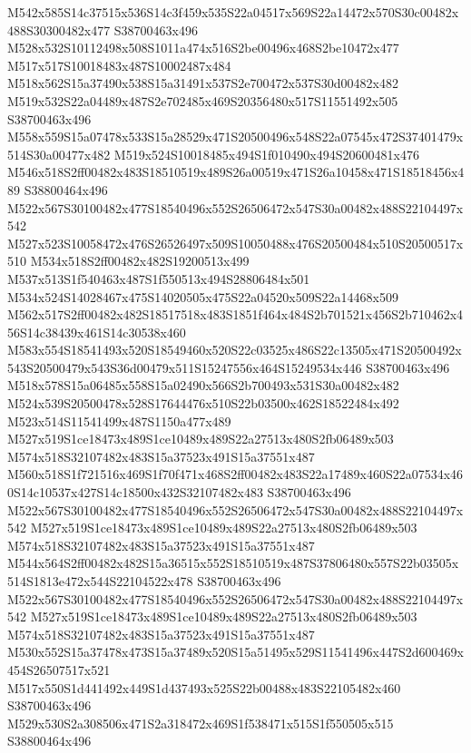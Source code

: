 \documentclass{article}
\begin{document}
\begin{multicols}{2}
M542x585S14c37515x536S14c3f459x535S22a04517x569S22a14472x570S30c00482x488S30300482x477 S38700463x496 M528x532S10112498x508S1011a474x516S2be00496x468S2be10472x477 M517x517S10018483x487S10002487x484 M518x562S15a37490x538S15a31491x537S2e700472x537S30d00482x482 M519x532S22a04489x487S2e702485x469S20356480x517S11551492x505 S38700463x496 M558x559S15a07478x533S15a28529x471S20500496x548S22a07545x472S37401479x514S30a00477x482 M519x524S10018485x494S1f010490x494S20600481x476 M546x518S2ff00482x483S18510519x489S26a00519x471S26a10458x471S18518456x489 S38800464x496 M522x567S30100482x477S18540496x552S26506472x547S30a00482x488S22104497x542 M527x523S10058472x476S26526497x509S10050488x476S20500484x510S20500517x510 M534x518S2ff00482x482S19200513x499 M537x513S1f540463x487S1f550513x494S28806484x501 M534x524S14028467x475S14020505x475S22a04520x509S22a14468x509 M562x517S2ff00482x482S18517518x483S1851f464x484S2b701521x456S2b710462x456S14c38439x461S14c30538x460 M583x554S18541493x520S18549460x520S22c03525x486S22c13505x471S20500492x543S20500479x543S36d00479x511S15247556x464S15249534x446 S38700463x496 M518x578S15a06485x558S15a02490x566S2b700493x531S30a00482x482 M524x539S20500478x528S17644476x510S22b03500x462S18522484x492 M523x514S11541499x487S1150a477x489 M527x519S1ce18473x489S1ce10489x489S22a27513x480S2fb06489x503 M574x518S32107482x483S15a37523x491S15a37551x487 M560x518S1f721516x469S1f70f471x468S2ff00482x483S22a17489x460S22a07534x460S14c10537x427S14c18500x432S32107482x483 S38700463x496 M522x567S30100482x477S18540496x552S26506472x547S30a00482x488S22104497x542 M527x519S1ce18473x489S1ce10489x489S22a27513x480S2fb06489x503 M574x518S32107482x483S15a37523x491S15a37551x487 M544x564S2ff00482x482S15a36515x552S18510519x487S37806480x557S22b03505x514S1813e472x544S22104522x478 S38700463x496 M522x567S30100482x477S18540496x552S26506472x547S30a00482x488S22104497x542 M527x519S1ce18473x489S1ce10489x489S22a27513x480S2fb06489x503 M574x518S32107482x483S15a37523x491S15a37551x487 M530x552S15a37478x473S15a37489x520S15a51495x529S11541496x447S2d600469x454S26507517x521 M517x550S1d441492x449S1d437493x525S22b00488x483S22105482x460 S38700463x496 M529x530S2a308506x471S2a318472x469S1f538471x515S1f550505x515 S38800464x496


\end{multicols}
\end{document}
